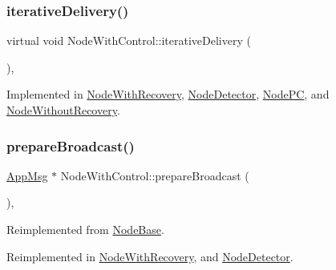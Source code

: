 \subsubsection{\texorpdfstring{iterative\+Delivery()}{iterativeDelivery()}}
{\footnotesize\ttfamily virtual void Node\+With\+Control\+::iterative\+Delivery (\begin{DoxyParamCaption}{ }\end{DoxyParamCaption})\hspace{0.3cm}{\ttfamily [protected]}, {}}



Implemented in \hyperlink{classNodeWithRecovery_a9b61912f38b62452584dc80bf261ef4e}{Node\+With\+Recovery}, \hyperlink{classNodeDetector_a17ecf9939fce7471f4513b66185743cc}{Node\+Detector}, \hyperlink{classNodePC_a7ac363db597ebadd3b18dd4343440aa1}{Node\+PC}, and \hyperlink{classNodeWithoutRecovery_a65e21db6d6b4e72b898fd567f8b4aee2}{Node\+Without\+Recovery}.

\mbox{\label{classNodeWithControl_ab871014cf3f42d834f8d34ad5498174c}} 
\subsubsection{\texorpdfstring{prepare\+Broadcast()}{prepareBroadcast()}}
{\footnotesize\ttfamily \hyperlink{classAppMsg}{App\+Msg} $\ast$ Node\+With\+Control\+::prepare\+Broadcast (\begin{DoxyParamCaption}{ }\end{DoxyParamCaption})\hspace{0.3cm}{\ttfamily [protected]}, {\ttfamily [virtual]}}



Reimplemented from \hyperlink{classNodeBase_a66c1dee9d15119bc3e68da71067ff6cd}{Node\+Base}.



Reimplemented in \hyperlink{classNodeWithRecovery_a33d8e8775fd69cb647b38a54b36e1ebe}{Node\+With\+Recovery}, and \hyperlink{classNodeDetector_af75cf37cc01fc51bc228a7a83c10cb97}{Node\+Detector}.

\mbox{\label{classNodeWithControl_af532082fab76c38d8c50ca90e991f4c3}} 
